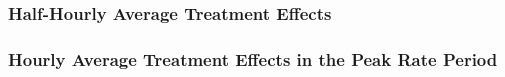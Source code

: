 \subsubsection{Half-Hourly Average Treatment Effects}
\label{Sub-subsection:Half-Hourly-Average-Treatment-Effects}



\subsubsection{Hourly Average Treatment Effects in the Peak Rate Period}
\label{Sub-subsection:Hourly-Average-Treatment-Effects-in-the-Peak-Rate-Period}
